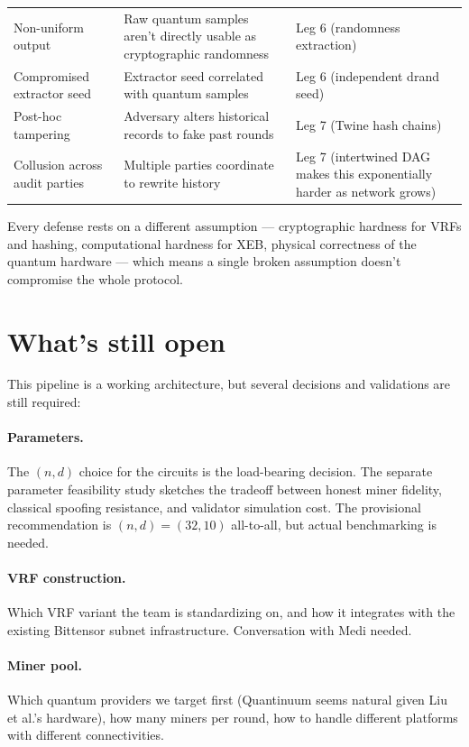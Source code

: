 \documentclass[11pt]{article}
\begin{document}
\begin{center}
\begin{tabular}{lp{4.5cm}p{6cm}}
Non-uniform output & Raw quantum samples aren't directly usable as cryptographic randomness & Leg 6 (randomness extraction) \\
Compromised extractor seed & Extractor seed correlated with quantum samples & Leg 6 (independent drand seed) \\
Post-hoc tampering & Adversary alters historical records to fake past rounds & Leg 7 (Twine hash chains) \\
Collusion across audit parties & Multiple parties coordinate to rewrite history & Leg 7 (intertwined DAG makes this exponentially harder as network grows) \\
\bottomrule
\end{tabular}
\end{center}

Every defense rests on a different assumption --- cryptographic hardness for VRFs and hashing, computational hardness for XEB, physical correctness of the quantum hardware --- which means a single broken assumption doesn't compromise the whole protocol.

\section{What's still open}

This pipeline is a working architecture, but several decisions and validations are still required:

\paragraph{Parameters.} The $(n, d)$ choice for the circuits is the load-bearing decision. The separate parameter feasibility study sketches the tradeoff between honest miner fidelity, classical spoofing resistance, and validator simulation cost. The provisional recommendation is $(n, d) = (32, 10)$ all-to-all, but actual benchmarking is needed.

\paragraph{VRF construction.} Which VRF variant the team is standardizing on, and how it integrates with the existing Bittensor subnet infrastructure. Conversation with Medi needed.

\paragraph{Miner pool.} Which quantum providers we target first (Quantinuum seems natural given Liu et al.'s hardware), how many miners per round, how to handle different platforms with different connectivities.
\end{document}
